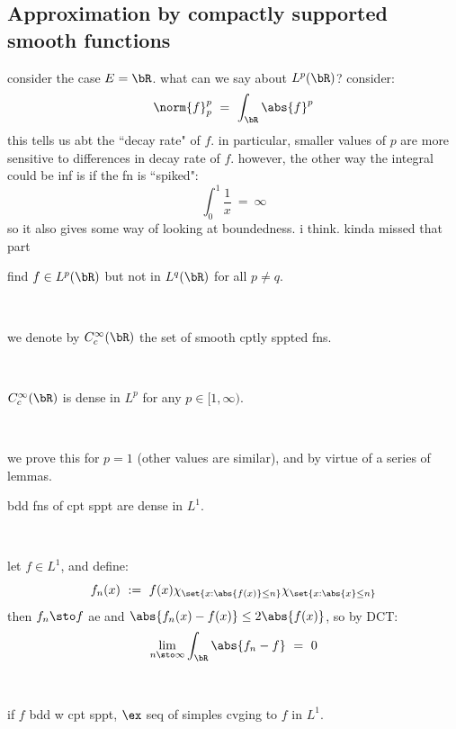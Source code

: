 \subsection{Approximation by compactly supported smooth functions}

consider the case $E=\bR$. what can we say about $L^{p}(\bR)$? consider:
\begin{equation*}
	\norm{f}_{p}^{p} \ = \ \int_{\bR}\abs{f}^{p}
\end{equation*}
this tells us abt the ``decay rate" of $f$.
in particular, smaller values of $p$ are more sensitive to differences in decay rate of $f$.
however, the other way the integral could be inf is if the fn is ``spiked":
\begin{equation*}
	\int_{0}^{1}\frac{1}{x} \ = \ \infty
\end{equation*}
so it also gives some way of looking at boundedness. i think. kinda missed that part

\begin{exr}
	find $f\in L^{p}(\bR)$ but not in $L^{q}(\bR)$ for all $p\neq q$.
\end{exr} \

\begin{defn}
	we denote by $C^{\infty}_{c}(\bR)$ the set of smooth cptly sppted fns.
\end{defn} \

\begin{thm}
	$C^{\infty}_{c}(\bR)$ is dense in $L^{p}$ for any $p\in[1,\infty)$.
\end{thm} \

we prove this for $p=1$ (other values are similar), and by virtue of a series
of lemmas.

\begin{lm}
	bdd fns of cpt sppt are dense in $L^{1}$.
\end{lm} \

\begin{pf}
	let $f\in L^{1}$, and define:
	\begin{equation*}
		f_{n}(x) \ := \ f(x)\chi_{\set{x:\abs{f(x)}\leq n}}\chi_{\set{x:\abs{x}\leq n}}
	\end{equation*}
	then $f_{n}\sto f$ ae and $\abs{f_{n}(x)-f(x)}\leq2\abs{f(x)}$, so by DCT:
	\begin{equation*}
		\lim_{n\sto\infty}\int_{\bR}\abs{f_{n}-f} \ = \ 0
	\end{equation*}
\end{pf} \

\begin{lm}
	if $f$ bdd w cpt sppt, $\ex$ seq of simples cvging to $f$ in $L^{1}$.
\end{lm} \

